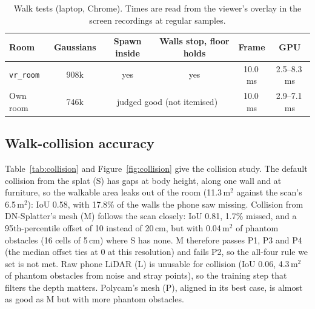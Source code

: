 \begin{table}[!htb]
\caption{Walk tests (laptop, Chrome). Times are read from the viewer's overlay in the screen recordings at regular samples.}
\label{tab:walk}
\centering
\small
\begin{tabular}{lccccc}
\hline
\textbf{Room} & \textbf{Gaussians} & \textbf{Spawn inside} & \textbf{Walls stop, floor holds} & \textbf{Frame} & \textbf{GPU} \\
\hline
\texttt{vr\_room} & 908k & yes & yes & 10.0\,ms & 2.5--8.3\,ms \\
Own room & 746k & \multicolumn{2}{c}{judged good (not itemised)} & 10.0\,ms & 2.9--7.1\,ms \\
\hline
\end{tabular}
\end{table}

\subsection{Walk-collision accuracy}
\label{sec:collision-results}
Table~\ref{tab:collision} and Figure~\ref{fig:collision} give the collision study. The default collision from the splat (S) has gaps at body height, along one wall and at furniture, so the walkable area leaks out of the room (11.3\,m$^2$ against the scan's 6.5\,m$^2$): IoU 0.58, with 17.8\% of the walls the phone saw missing. Collision from DN-Splatter's mesh (M) follows the scan closely: IoU 0.81, 1.7\% missed, and a 95th-percentile offset of 10 instead of 20\,cm, but with 0.04\,m$^2$ of phantom obstacles (16 cells of 5\,cm) where S has none. M therefore passes P1, P3 and P4 (the median offset ties at 0 at this resolution) and fails P2, so the all-four rule we set is not met. Raw phone LiDAR (L) is unusable for collision (IoU 0.06, 4.3\,m$^2$ of phantom obstacles from noise and stray points), so the training step that filters the depth matters. Polycam's mesh (P), aligned in its best case, is almost as good as M but with more phantom obstacles.

